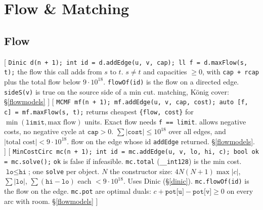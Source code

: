\section{Flow \& Matching}
\threelevels
{}

\subsection{Flow}
[
	 \texttt{Dinic d(n + 1); int id = d.addEdge(u, v, cap); ll f = d.maxFlow(s, t);}
	 the flow this call adds from $s$ to $t$.
	 $s \ne t$ and capacities $\ge 0$, with \texttt{cap + rcap} plus the total flow below $9 \cdot 10^{18}$.
	 \texttt{flowOf(id)} is the flow on a directed edge.
	 \texttt{sideS(v)} is true on the source side of a min cut.
	 matching, K\"onig cover: \S\ref{flowmodels}
]\label{dinic}
[
	 \texttt{MCMF mf(n + 1); mf.addEdge(u, v, cap, cost); auto [f, c] = mf.maxFlow(s, t);}
	 returns cheapest \texttt{\{flow, cost\}} for $\min(\texttt{limit}, \text{max flow})$ units. Exact flow needs \texttt{f == limit}.
	 allows negative costs, no negative cycle at $\texttt{cap} > 0$. $\sum |\texttt{cost}| \le 10^{18}$ over all edges, and $|\text{total cost}| < 9 \cdot 10^{18}$.
	 flow on the edge whose id \texttt{addEdge} returned.
	 \S\ref{flowmodels}.
]\label{mcmf}
[
	 \texttt{MinCostCirc mc(n + 1); int id = mc.addEdge(u, v, lo, hi, c); bool ok = mc.solve();}
	 \texttt{ok} is false if infeasible. \texttt{mc.total} (\texttt{\_\_int128}) is the min cost.
	 $\texttt{lo} \le \texttt{hi}$; one \texttt{solve} per object. $N$ the constructor size: $4N(N + 1) \max |c|$, $\sum |\texttt{lo}|$, $\sum (\texttt{hi} - \texttt{lo})$ each $< 9 \cdot 10^{18}$. Uses Dinic (\S\ref{dinic}).
	 \texttt{mc.flowOf(id)} is the flow on the edge. \texttt{mc.pot} are optimal duals: $c + \texttt{pot[u]} - \texttt{pot[v]} \ge 0$ on every arc with room.
	 \S\ref{flowmodels}
]\label{costscaling}
\label{flowmodels}
